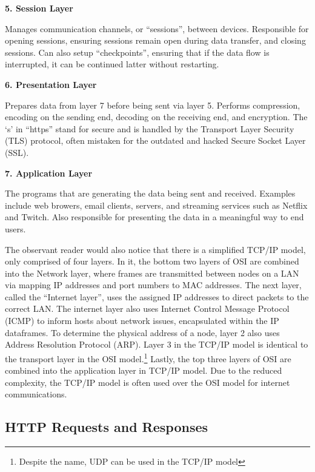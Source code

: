 \documentclass[11pt]{article}
\begin{document}
{\vspace{\baselineskip}
\textbf{5. Session Layer}

Manages communication channels, or ``sessions'', between devices. Responsible for opening sessions, ensuring sessions remain open during data transfer, and closing sessions. Can also setup ``checkpoints'', ensuring that if the data flow is interrupted, it can be continued latter without restarting.

\vspace{\baselineskip}
\textbf{6. Presentation Layer}

Prepares data from layer 7 before being sent via layer 5. Performs compression, encoding on the sending end, decoding on the receiving end, and encryption. The `s' in ``https'' stand for secure and is handled by the Transport Layer Security (TLS) protocol, often mistaken for the outdated and hacked Secure Socket Layer (SSL).

\vspace{\baselineskip}
\textbf{7. Application Layer}

The programs that are generating the data being sent and received. Examples include web browers, email clients, servers, and streaming services such as Netflix and Twitch. Also responsible for presenting the data in a meaningful way to end users.
}

\vspace{\baselineskip}

The observant reader would also notice that there is a simplified TCP/IP model, only comprised of four layers. In it, the bottom two layers of OSI are combined into the Network layer, where frames are transmitted between nodes on a LAN via mapping IP addresses and port numbers to MAC addresses. The next layer, called the ``Internet layer'', uses the assigned IP addresses to direct packets to the correct LAN. The internet layer also uses Internet Control Message Protocol (ICMP) to inform hosts about network issues, encapsulated within the IP dataframes. To determine the physical address of a node, layer 2 also uses Address Resolution Protocol (ARP). Layer 3 in the TCP/IP model is identical to the transport layer in the OSI model.\footnote{Despite the name, UDP can be used in the TCP/IP model} Lastly, the top three layers of OSI are combined into the application layer in TCP/IP model. Due to the reduced complexity, the TCP/IP model is often used over the OSI model for internet communications.


\subsection{HTTP Requests and Responses}
\end{document}
